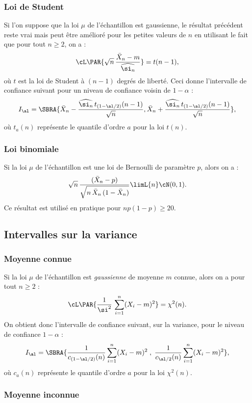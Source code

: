 \subsubsection{Loi de Student} 

Si l'on suppose que la loi $\mu$ de l'échantillon est gaussienne, le résultat
précédent reste vrai mais peut être amélioré pour les petites valeurs de $n$
en utilisant le fait que pour tout $n\geq 2$, on a :
$$
\cL\PAR{\sqrt{n}\,\frac{\bar{X}_n-m}{\widehat{\si_n}}} = t(n-1),
$$
où $t$ est la loi de Student à $(n-1)$ degrés de liberté. Ceci donne
l'intervalle de confiance suivant pour un niveau de confiance voisin de
$1-\alpha$ :
$$
I_\al=\SBRA{\bar{X}_n-\frac{\widehat{\si_n}\,t_{(1-\al/2)}(n-1)}{\sqrt{n}},
  \bar{X}_n+\frac{\widehat{\si_n}\,t_{(1-\al/2)}(n-1)}{\sqrt{n}}},
$$
où $t_a(n)$ représente le quantile d'ordre $a$ pour la loi $t(n)$.

\subsubsection{Loi binomiale} 

Si la loi $\mu$ de l'échantillon est une loi de Bernoulli de paramètre $p$,
alors on a :
$$
\sqrt{n}\,\frac{(\bar{X}_n-p)}{\sqrt{n\,\bar{X}_n\,(1-\bar{X}_n)}}
\limL{n}\cN(0,1).
$$
Ce résultat est utilisé en pratique pour $np(1-p)\geq 20$.


\subsection{Intervalles sur la variance} 


\subsubsection{Moyenne connue} 

Si la loi $\mu$ de l'échantillon est \emph{gaussienne} de moyenne $m$ connue,
alors on a pour tout $n \geq 2$ :
$$
\cL\PAR{\frac{1}{\si^2}\,\sum_{i=1}^n (X_i-m)^2}= \chi^2 (n).
$$
On obtient donc l'intervalle de confiance suivant, sur la variance, pour le
niveau de confiance $1-\alpha$ :
$$
I_\al=\SBRA{\frac{1}{c_{(1-\al/2)}(n)}\sum_{i=1}^n (X_i-m)^2\;,\;
  \frac{1}{c_{\al/2}(n)}\sum_{i=1}^n (X_i-m)^2},
$$
où $c_a(n)$ représente le quantile d'ordre $a$ pour la loi $\chi^2(n)$.

\subsubsection{Moyenne inconnue} 

